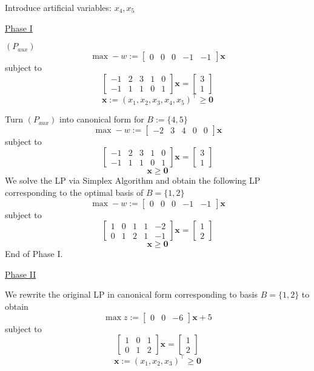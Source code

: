 Introduce artificial variables: $ x_4, x_5 $

\underline{Phase I}

$ (P_{aux}) $ 
\[\max -w:=\begin{bmatrix} 0 & 0 & 0 & -1 & -1 \end{bmatrix} \bm{x} \]
subject to
\[
    \begin{bmatrix}
        -1 & 2 & 3 & 1 & 0\\
        -1 & 1 & 1 & 0 & 1
    \end{bmatrix}
    \bm{x}=
    \begin{bmatrix}
        3\\
        1
    \end{bmatrix}
\]
\[ \bm{x}:=(x_1,x_2,x_3,x_4,x_5)^\top \ge \bm{0} \]

Turn $ (P_{aux}) $ into canonical form for $ B:=\{4,5\} $
\[\max -w:=\begin{bmatrix} -2 & 3 & 4 & 0 & 0 \end{bmatrix} \bm{x} \]
    subject to
    \[
        \begin{bmatrix}
            -1 & 2 & 3 & 1 & 0\\
            -1 & 1 & 1 & 0 & 1
        \end{bmatrix}
        \bm{x}=
        \begin{bmatrix}
            3\\
            1
        \end{bmatrix}
    \]
\[ \bm{x}\ge \bm{0} \]
We solve the LP via Simplex Algorithm and obtain the following
LP corresponding to the optimal basis of $ B=\{1,2\} $
\[\max -w:=\begin{bmatrix} 0 & 0 & 0 & -1 & -1 \end{bmatrix} \bm{x} \]
    subject to
    \[
        \begin{bmatrix}
            1 & 0 & 1 & 1 & -2\\
            0 & 1 & 2 & 1 & -1
        \end{bmatrix}
        \bm{x}=
        \begin{bmatrix}
            1\\
            2
        \end{bmatrix}
    \]
\[ \bm{x}\ge \bm{0} \]
End of Phase I.

\underline{Phase II}

We rewrite the original LP in canonical form corresponding
to basis $ B=\{1,2\} $ to obtain
\[ \max z:= \begin{bmatrix}0 & 0 & -6 \end{bmatrix}\bm{x}+5 \]
subject to
\[ \begin{bmatrix}
    1 & 0 & 1\\
    0 & 1 & 2
\end{bmatrix}\bm{x}=
\begin{bmatrix}
    1\\
    2
\end{bmatrix} \]
\[ \bm{x}:=(x_1,x_2,x_3)^\top\ge \bm{0} \]

